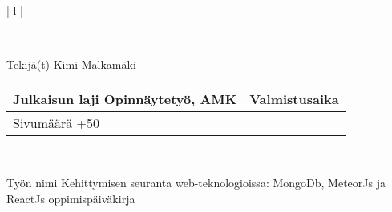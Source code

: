 
\begin{tabular}{ | l | }

    \\

    \hline
    \begin{minipage}[b]{6cm}
        Tekijä(t)
        \newline
        Kimi Malkamäki 
    \end{minipage}%
    \begin{minipage}{8.5cm}
        \begin{tabular}{ | l | c | }
            \begin{minipage}[t][1cm][t]{4.25cm}
                Julkaisun laji
                \newline
                Opinnäytetyö, AMK
            \end{minipage} & %
            \begin{minipage}{3.6cm}
                Valmistusaika
                \newline
                2024
            \end{minipage} \\ \hline%
            \begin{minipage}[t][1.01cm][t]{4.25cm}
                Sivumäärä
                \newline 
                31+50
            \end{minipage}
            &  \\ \hline
        \end{tabular}
    \end{minipage}%
      \\ \hline

    \begin{minipage}[t][2cm][t]{14cm}
    Työn nimi 
        \newline 
        Kehittymisen seuranta web-teknologioissa: MongoDb, MeteorJs ja ReactJs   
        \newline 
    oppimispäiväkirja  
    \end{minipage}\\ \hline


\end{tabular}
